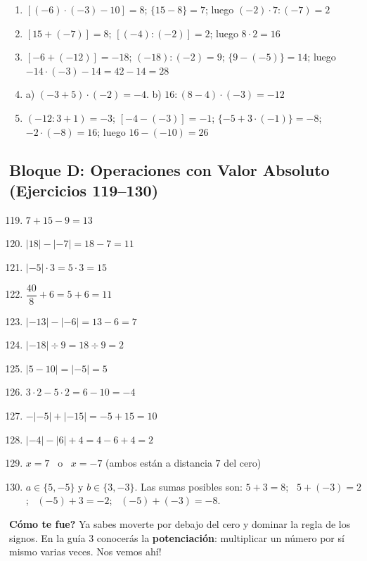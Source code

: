 \documentclass[12pt, letterpaper]{article}
\begin{document}
\begin{enumerate}[leftmargin=*, label=\textbf{\arabic*.}]
  \item $[(-6) \cdot (-3) - 10] = 8$; $\{15 - 8\} = 7$; luego $(-2) \cdot 7 : (-7) = 2$
  \item $[15 + (-7)] = 8$; $[(-4) : (-2)] = 2$; luego $8 \cdot 2 = 16$
  \item $[-6 + (-12)] = -18$; $(-18) : (-2) = 9$; $\{9 - (-5)\} = 14$; luego $-14 \cdot (-3) - 14 = 42 - 14 = 28$
  \item a) $(-3 + 5) \cdot (-2) = -4$. \quad b) $16 : (8 - 4) \cdot (-3) = -12$
  \item $(-12 : 3 + 1) = -3$; $[-4 - (-3)] = -1$; $\{-5 + 3 \cdot (-1)\} = -8$; $-2 \cdot (-8) = 16$; luego $16 - (-10) = 26$
\end{enumerate}

\subsection*{Bloque D: Operaciones con Valor Absoluto (Ejercicios 119--130)}

\begin{enumerate}[leftmargin=*, label=\textbf{\arabic*.}]
  \setcounter{enumi}{118}
  \item $7 + 15 - 9 = 13$
  \item $|18| - |-7| = 18 - 7 = 11$
  \item $|-5| \cdot 3 = 5 \cdot 3 = 15$
  \item $\dfrac{40}{8} + 6 = 5 + 6 = 11$
  \item $|-13| - |-6| = 13 - 6 = 7$
  \item $|-18| \div 9 = 18 \div 9 = 2$
  \item $|5 - 10| = |-5| = 5$
  \item $3 \cdot 2 - 5 \cdot 2 = 6 - 10 = -4$
  \item $-|-5| + |-15| = -5 + 15 = 10$
  \item $|-4| - |6| + 4 = 4 - 6 + 4 = 2$
  \item $x = 7$ \ o \ $x = -7$ (ambos están a distancia $7$ del cero)
  \item $a \in \{5, -5\}$ y $b \in \{3, -3\}$. Las sumas posibles son:
        $5 + 3 = 8$; \ $5 + (-3) = 2$; \ $(-5) + 3 = -2$; \ $(-5) + (-3) = -8$.
\end{enumerate}

\vspace{10pt}
\begin{cuadrosolucion}
  \textbf{\textquestiondown Cómo te fue?} Ya sabes moverte por debajo del cero y dominar la regla de los signos. En la guía 3 conocerás la \textbf{potenciación}: multiplicar un número por sí mismo varias veces. \textquestiondown Nos vemos ahí!
\end{cuadrosolucion}

\fi
\end{document}
